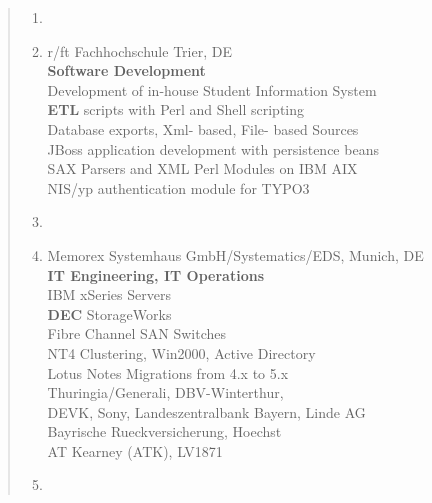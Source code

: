 \documentclass[a4paper]{report}
\begin{document}
\begin{quote}
\begin{enumerate}
\item[ ]

\item[2004 - 2006]  r/ft Fachhochschule Trier, DE\\
                    \textbf{Software Development}\\
                    Development of in-house Student Information System\\
                    \textbf{ETL} scripts with Perl and Shell scripting\\
                    Database exports, Xml- based, File- based Sources\\
                    JBoss application development with persistence beans\\
                    SAX Parsers and XML Perl Modules on IBM AIX\\
                    NIS/yp authentication module for TYPO3

\item[ ]

\item[1999 - 2004]  Memorex Systemhaus GmbH/Systematics/EDS, Munich, DE\\
                    \textbf{IT Engineering, IT Operations}\\
                    IBM xSeries Servers\\
                    \textbf{DEC} StorageWorks\\
                    Fibre Channel SAN Switches\\
                    NT4 Clustering, Win2000, Active Directory\\
                    Lotus Notes Migrations from 4.x to 5.x\\
                    Thuringia/Generali, DBV-Winterthur,\\
                    DEVK, Sony, Landeszentralbank Bayern, Linde AG\\
                    Bayrische Rueckversicherung, Hoechst\\
                    AT Kearney (ATK), LV1871

\item[ ]


\end{enumerate}
\end{quote}
\end{document}
